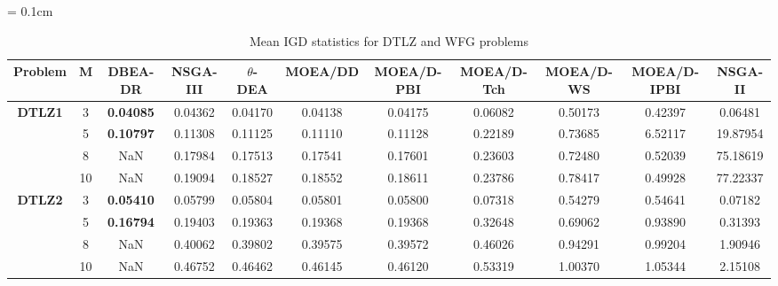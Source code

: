 \documentclass[conference]{IEEEtran}
\begin{document}
\begin{table*}[!htb]\scriptsize
	\centering
	\renewcommand{\arraystretch}{0.9}
	\caption{Mean IGD statistics for DTLZ and WFG problems}
	\label{tab:IGDunc}
	\tabcolsep = 0.1cm
	\begin{tabular}{|c|c|c|c|c|c|c|c|c|c|c|}
		\noalign{\smallskip}\hline
		\textbf{Problem}                & \textbf{M} & \textbf{DBEA-DR} & \textbf{NSGA-III} & \textbf{$\theta$-DEA} & \textbf{MOEA/DD} & \textbf{MOEA/D-PBI} & \textbf{MOEA/D-Tch} & \textbf{MOEA/D-WS} & \textbf{MOEA/D-IPBI} & \textbf{NSGA-II} \\ \hline
		\multirow{4}{*}{\textbf{DTLZ1}} & 3          & \textbf{0.04085} & 0.04362           & 0.04170               & 0.04138          & 0.04175             & 0.06082             & 0.50173            & 0.42397              & 0.06481          \\ \cline{2-11} 
		& 5          & \textbf{0.10797} & 0.11308           & 0.11125               & 0.11110          & 0.11128             & 0.22189             & 0.73685            & 6.52117              & 19.87954         \\ \cline{2-11} 
		& 8          & NaN              & 0.17984           & 0.17513               & 0.17541          & 0.17601             & 0.23603             & 0.72480            & 0.52039              & 75.18619         \\ \cline{2-11} 
		& 10         & NaN              & 0.19094           & 0.18527               & 0.18552          & 0.18611             & 0.23786             & 0.78417            & 0.49928              & 77.22337         \\ \hline
		\multirow{4}{*}{\textbf{DTLZ2}} & 3          & \textbf{0.05410} & 0.05799           & 0.05804               & 0.05801          & 0.05800             & 0.07318             & 0.54279            & 0.54641              & 0.07182          \\ \cline{2-11} 
		& 5          & \textbf{0.16794} & 0.19403           & 0.19363               & 0.19368          & 0.19368             & 0.32648             & 0.69062            & 0.93890              & 0.31393          \\ \cline{2-11} 
		& 8          & NaN              & 0.40062           & 0.39802               & 0.39575          & 0.39572             & 0.46026             & 0.94291            & 0.99204              & 1.90946          \\ \cline{2-11} 
		& 10         & NaN              & 0.46752           & 0.46462               & 0.46145          & 0.46120             & 0.53319             & 1.00370            & 1.05344              & 2.15108          \\ \hline

\end{tabular}
\end{table*}
\end{document}
